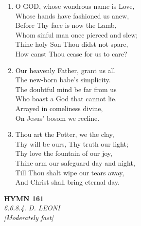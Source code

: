 \documentclass[11pt,a4paper]{article}
\begin{document}
\begin{enumerate}
    \item O GOD, whose wondrous name is Love, \\
        Whose hands have fashioned us anew, \\
        Before Thy face is now the Lamb, \\
        Whom sinful man once pierced and slew; \\
        Thine holy Son Thou didst not spare, \\
        How canst Thou cease for us to care?

    \item Our heavenly Father, grant us all \\
        The new-born babe's simplicity. \\
        The doubtful mind be far from us \\
        Who boast a God that cannot lie. \\
        Arrayed in comeliness divine, \\
        On Jesus' bosom we recline.

    \item Thou art the Potter, we the clay, \\
        Thy will be ours, Thy truth our light; \\
        Thy love the fountain of our joy, \\
        Thine arm our safeguard day and night, \\
        Till Thou shalt wipe our tears away, \\
        And Christ shall bring eternal day.

\end{enumerate}

\newpage
\begin{center}
    {\Large \textbf{HYMN 161}}
    \\
    \textit{6.6.8.4. D. LEONI}
    \\
    \textit{\small [Moderately fast]}
\end{center}
\vspace{1em}
\end{document}
